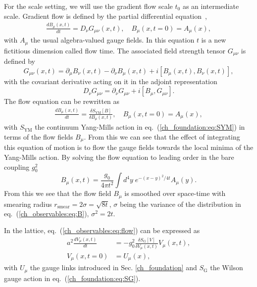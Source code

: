 For the scale setting, we will use the gradient flow scale $t_0$ as an intermediate scale. Gradient flow is defined by the partial differential equation~\citep{Luscher:2010we},\citep{1006.4518}
\begin{gather}
\label{ch_observables:eq:flow}
\frac{dB_{\mu}(x,t)}{dt}=D_{\nu}G_{\mu\nu}(x,t), \quad B_{\mu}(x,t=0)=A_{\mu}(x),
\end{gather}
with $A_{\mu}$ the usual algebra-valued gauge fields. In this equation $t$ is a new fictitious dimension called flow time. The associated field strength tensor $G_{\mu\nu}$ is defined by
\begin{equation}
G_{\mu\nu}(x,t)=\partial_{\mu}B_{\nu}(x,t)-\partial_{\nu}B_{\mu}(x,t)+i\left[B_{\mu}(x,t),B_{\nu}(x,t)\right],
\end{equation}
with the covariant derivative acting on it in the adjoint representation
\begin{equation}
D_{\nu}G_{\mu\nu}=\partial_{\nu}G_{\mu\nu}+i\left[B_{\mu},G_{\mu\nu}\right].
\end{equation}
The flow equation can be rewritten as
\begin{gather}
\frac{dB_{\mu}(x,t)}{dt}=\frac{\delta S_{\textrm{YM}}[B]}{\delta B_{\mu}(x,t)}, \quad B_{\mu}(x,t=0)=A_{\mu}(x),
\end{gather}
with $S_{\textrm{YM}}$ the continuum Yang-Mills action in eq.~(\ref{ch_foundation:eq:SYM}) in terms of the flow fields $B_{\mu}$. From this we can see that the effect of integrating this equation of motion is to flow the gauge fields towards the local minima of the Yang-Mills action. By solving the flow equation to leading order in the bare coupling $g_0^2$
\begin{equation}
\label{ch_observables:eq:B}
B_{\mu}(x,t)=\frac{g_0}{4\pi t^2}\int d^4y\;e^{-(x-y)^2/4t}A_{\mu}(y).
\end{equation}
From this we see that the flow field $B_{\mu}$ is smoothed over space-time with smearing radius $r_{\textrm{smear}}=2\sigma=\sqrt{8t}$, $\sigma$ being the variance of the distribution in eq.~(\ref{ch_observables:eq:B}), $\sigma^2=2t$.

In the lattice, eq.~(\ref{ch_observables:eq:flow}) can be expressed as 
\begin{align}
a^2\frac{dV_{\mu}(x,t)}{dt}&=-g_0^2\frac{\delta S_{\textrm{G}}[V]}{\delta V_{\mu}(x,t)}V_{\mu}(x,t),\\
V_{\mu}(x,t=0)&=U_{\mu}(x),
\end{align}
with $U_{\mu}$ the gauge links introduced in Sec. \ref{ch_foundation} and $S_{\textrm{G}}$ the Wilson gauge action in eq.~(\ref{ch_foundation:eq:SG}).

